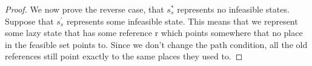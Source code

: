 \begin{proof}

We now prove the reverse case, that $s_s^*$ represents no infeasible states. Suppose that $s_s^\prime$ represents some infeasible state. This means that we represent some lazy state that has some reference r which points somewhere that no place in the feasible set points to. Since we don't change the path condition, all the old references still point exactly to the same places they used to. 


\end{proof}
